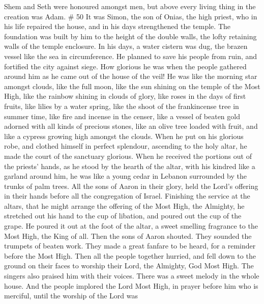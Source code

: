 Shem and Seth were honoured amongst men, but above every living thing in
the creation was Adam. \# 50  It was Simon, the son of
Onias, the high priest, who in his life repaired the house, and in his
days strengthened the temple.  The foundation was built by
him to the height of the double walls, the lofty retaining walls of the
temple enclosure.  In his days, a water cistern was dug, the
brazen vessel like the sea in circumference.  He planned to
save his people from ruin, and fortified the city against siege.
 How glorious he was when the people gathered around him as
he came out of the house of the veil!  He was like the
morning star amongst clouds, like the full moon,  like the
sun shining on the temple of the Most High, like the rainbow shining in
clouds of glory,  like roses in the days of first fruits,
like lilies by a water spring, like the shoot of the frankincense tree
in summer time,  like fire and incense in the censer, like a
vessel of beaten gold adorned with all kinds of precious stones,
 like an olive tree loaded with fruit, and like a cypress
growing high amongst the clouds.  When he put on his
glorious robe, and clothed himself in perfect splendour, ascending to
the holy altar, he made the court of the sanctuary glorious.
 When he received the portions out of the priests' hands,
as he stood by the hearth of the altar, with his kindred like a garland
around him, he was like a young cedar in Lebanon surrounded by the
trunks of palm trees.  All the sons of Aaron in their
glory, held the Lord's offering in their hands before all the
congregation of Israel.  Finishing the service at the
altars, that he might arrange the offering of the Most High, the
Almighty,  he stretched out his hand to the cup of
libation, and poured out the cup of the grape. He poured it out at the
foot of the altar, a sweet smelling fragrance to the Most High, the King
of all.  Then the sons of Aaron shouted. They sounded the
trumpets of beaten work. They made a great fanfare to be heard, for a
reminder before the Most High.  Then all the people
together hurried, and fell down to the ground on their faces to worship
their Lord, the Almighty, God Most High.  The singers also
praised him with their voices. There was a sweet melody in the whole
house.  And the people implored the Lord Most High, in
prayer before him who is merciful, until the worship of the Lord was
